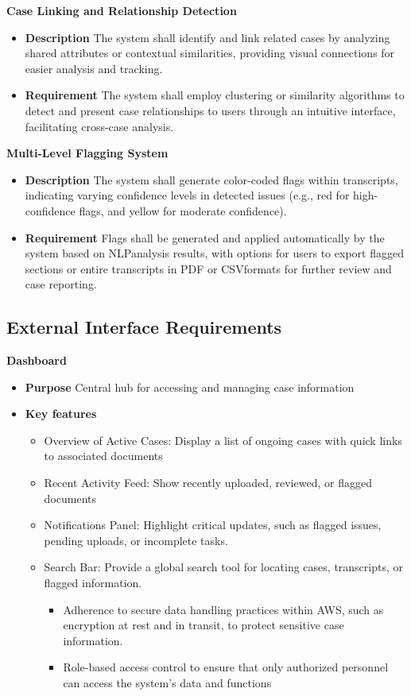 \documentclass[12pt]{article}
\begin{document}
\textbf{  Case Linking and Relationship Detection}
\begin{itemize}
  \item \textbf{Description} The system shall identify and link related cases by analyzing shared attributes
 or contextual similarities, providing visual connections for easier analysis and tracking.
  \item \textbf{Requirement}  The system shall employ clustering or similarity algorithms to detect and
 present case relationships to users through an intuitive interface, facilitating cross-case
 analysis.
\end{itemize}

\textbf{ Multi-Level Flagging System}
\begin{itemize}
  \item \textbf{Description} The system shall generate color-coded flags within transcripts, indicating
 varying confidence levels in detected issues (e.g., red for high-confidence flags, and yellow
 for moderate confidence).
  \item \textbf{Requirement}   Flags shall be generated and applied automatically by the system based on
 NLPanalysis results, with options for users to export flagged sections or entire transcripts in
 PDF or CSVformats for further review and case reporting.
\end{itemize}

\subsection{External Interface Requirements}


\textbf{  Dashboard}
\begin{itemize}
  \item \textbf{Purpose} Central hub for accessing and managing case information
  \item \textbf{Key features}   
	\begin{itemize}
		\item  Overview of Active Cases: Display a list of ongoing cases with quick links to associated
 documents
		\item Recent Activity Feed: Show recently uploaded, reviewed, or flagged documents
		\item  Notifications Panel: Highlight critical updates, such as flagged issues, pending uploads,
 or incomplete tasks.
		\item Search Bar: Provide a global search tool for locating cases, transcripts, or flagged
 information.
		\begin{itemize}
			\item    Adherence to secure data handling practices within AWS, such as encryption at rest and in transit, to protect sensitive case information.
			\item Role-based access control to ensure that only authorized personnel can access the system’s data and functions
		\end{itemize}
	\end{itemize}
\end{itemize}
\end{document}
